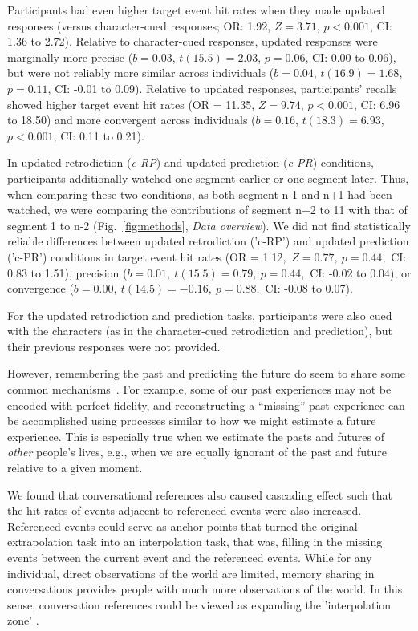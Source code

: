 Participants had even higher target event hit rates when they made updated responses (versus character-cued responses; OR: 1.92, $Z = 3.71$, $p < 0.001$, CI: 1.36 to 2.72).  Relative to character-cued responses, updated responses were marginally more precise ($b = 0.03$, $t(15.5) = 2.03$, $p = 0.06$, CI: 0.00 to 0.06), but were not reliably more similar across individuals ($b = 0.04$, $t(16.9) = 1.68$, $p = 0.11$, CI: -0.01 to 0.09).  Relative to updated responses, participants' recalls showed higher target event hit rates (OR = 11.35, $Z = 9.74$, $p < 0.001$, CI: 6.96 to 18.50) and more convergent across individuals ($b = 0.16$, $t(18.3) = 6.93$, $p < 0.001$, CI: 0.11 to 0.21). 

In updated retrodiction (\textit{c-RP}) and updated prediction (\textit{c-PR}) conditions, participants additionally watched one segment earlier or one segment later. Thus, when comparing these two conditions, as both segment n-1 and n+1 had been watched, we were comparing the contributions of segment n+2 to 11 with that of segment 1 to n-2 (Fig.~\ref{fig:methods}, \textit{Data overview}).
We did not find statistically reliable differences between updated retrodiction ('c-RP') and updated prediction ('c-PR') conditions in target event hit rates (OR = 1.12,~$Z = 0.77,~p = 0.44$,~CI: 0.83 to 1.51), precision ($b = 0.01,~t(15.5) = 0.79,~p = 0.44$,~CI: -0.02 to 0.04), or convergence ($b = 0.00,~t(14.5) = -0.16,~p = 0.88$,~CI: -0.08 to 0.07). 

For the updated retrodiction and prediction tasks, participants were also cued with the characters (as in the character-cued retrodiction and prediction), but their previous responses were not provided. 

 However, remembering the past and predicting the future do seem to share some common mechanisms~\citep[e.g.,][]{SchaEtal07}.  For example, some of our past experiences may not be encoded with perfect fidelity, and reconstructing a ``missing'' past experience can be accomplished using processes similar to how we might estimate a future experience.  This is especially true when we estimate the pasts and futures of \textit{other} people's lives, e.g., when we are equally ignorant of the past and future relative to a given moment.

We found that conversational references also caused cascading effect such that the hit rates of events adjacent to referenced events were also increased. Referenced events could serve as anchor points that turned the original extrapolation task into an interpolation task, that was, filling in the missing events between the current event and the referenced events. While for any individual, direct observations of the world are limited, memory sharing in conversations provides people with much more observations of the world. In this sense, conversation references could be viewed as expanding the 'interpolation zone' \citep{HassEtal20}. 

